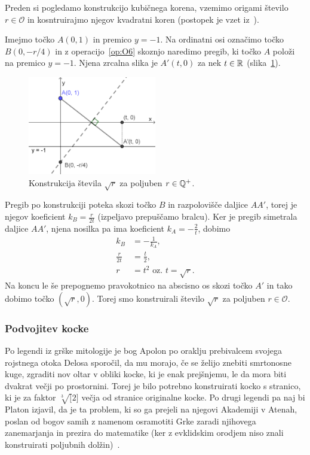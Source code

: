 Preden si pogledamo konstrukcijo kubičnega korena, vzemimo origami število $r \in \mathcal{O}$ in kosntruirajmo njegov kvadratni koren (postopek je vzet iz~\cite[str.\ 58]{hull2013}).

Imejmo točko $A (0, 1) $ in premico $y = -1$. Na ordinatni osi označimo točko $B (0, -r/4)$ in z operacijo~\ref{op:O6} skoznjo naredimo pregib, ki točko $A$ položi na premico $y = -1$. Njena zrcalna slika je $A' (t, 0) $ za nek $t \in \mathbb R$ (slika~\ref{fig:konstrukcija_korena}).

\begin{figure}[h]
    \centering
    \includegraphics[width=0.5\textwidth]{images/kvadratni_koren.png}
    \caption[Konstrukcija korena]{Konstrukcija števila $\sqrt{r}$ za poljuben $r \in \mathbb Q^{+}$.}
    \label{fig:konstrukcija_korena}
\end{figure}

Pregib po konstrukciji poteka skozi točko $B$ in razpolovišče daljice $AA'$, torej je njegov koeficient $k_B = \frac{r}{2t}$ (izpeljavo prepuščamo bralcu). Ker je pregib simetrala daljice $AA'$, njena nosilka pa ima koeficient $k_A = - \frac{2}{t}$, dobimo
\begin{align*}
    k_B &= - \frac{1}{k_A},\\
    \frac{r}{2t} &= \frac{t}{2},\\
    r &= t^2 \text{ oz. } t = \sqrt{r}.
\end{align*}
Na koncu le še prepognemo pravokotnico na abscisno os skozi točko $A'$ in tako dobimo točko $(\sqrt{r}, 0)$. Torej smo konstruirali število $\sqrt{r}$ za poljuben $r \in \mathcal{O}$.

\subsubsection{Podvojitev kocke}
\label{podpogl:podvojitev_kocke}

Po legendi iz grške mitologije je bog Apolon po oraklju prebivalcem svojega rojstnega otoka Delosa sporočil, da mu morajo, če se želijo znebiti smrtonosne kuge, zgraditi nov oltar v obliki kocke, ki je enak prejšnjemu, le da mora biti dvakrat večji po prostornini. Torej je bilo potrebno konstruirati kocko s stranico, ki je za faktor $\sqrt[3][2]$ večja od stranice originalne kocke. Po drugi legendi pa naj bi Platon izjavil, da je ta problem, ki so ga prejeli na njegovi Akademiji v Atenah, poslan od bogov samih z namenom osramotiti Grke zaradi njihovega zanemarjanja in prezira do matematike (ker z evklidskim orodjem niso znali konstruirati poljubnih dolžin)~\cite[str.\ 29]{geometricconstructions}.

